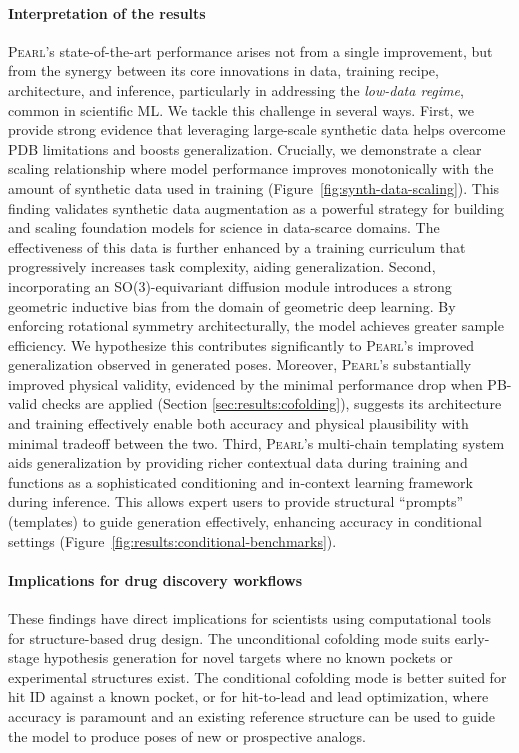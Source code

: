 \documentclass[11pt, letterpaper, onecolumn]{tau-class/tau}
\newcommand{\pearl}{\textsc{Pearl}\xspace}
\begin{document}
\paragraph{Interpretation of the results}
\pearl's state-of-the-art performance arises not from a single improvement, but from the synergy between its core innovations in data, training recipe, architecture, and inference, particularly in addressing the \textit{low-data regime}, common in scientific ML. We tackle this challenge in several ways.
First, we provide strong evidence that leveraging large-scale synthetic data helps overcome PDB limitations and boosts generalization.
Crucially, we demonstrate a clear scaling relationship where model performance improves monotonically with the amount of synthetic data used in training (Figure~\ref{fig:synth-data-scaling}).
This finding validates synthetic data augmentation as a powerful strategy for building and scaling foundation models for science in data-scarce domains.
The effectiveness of this data is further enhanced by a training curriculum that progressively increases task complexity, aiding generalization.
Second, incorporating an SO(3)-equivariant diffusion module introduces a strong geometric inductive bias from the domain of geometric deep learning.
By enforcing rotational symmetry architecturally, the model achieves greater sample efficiency.
We hypothesize this contributes significantly to \pearl's improved generalization observed in generated poses.
Moreover, \pearl's substantially improved physical validity, evidenced by the minimal performance drop when PB-valid checks are applied (Section \ref{sec:results:cofolding}), suggests its architecture and training effectively enable both accuracy and physical plausibility with minimal tradeoff between the two.
Third, \pearl's multi-chain templating system aids generalization by providing richer contextual data during training and functions as a sophisticated conditioning and in-context learning framework during inference.
This allows expert users to provide structural ``prompts'' (templates) to guide generation effectively, enhancing accuracy in conditional settings (Figure~\ref{fig:results:conditional-benchmarks}).

\paragraph{Implications for drug discovery workflows}
These findings have direct implications for scientists using computational tools for structure-based drug design.
The unconditional cofolding mode suits early-stage hypothesis generation for novel targets where no known pockets or experimental structures exist.
The conditional cofolding mode is better suited for hit ID against a known pocket, or for hit-to-lead and lead optimization, where accuracy is paramount and an existing reference structure can be used to guide the model to produce poses of new or prospective analogs.
\end{document}
